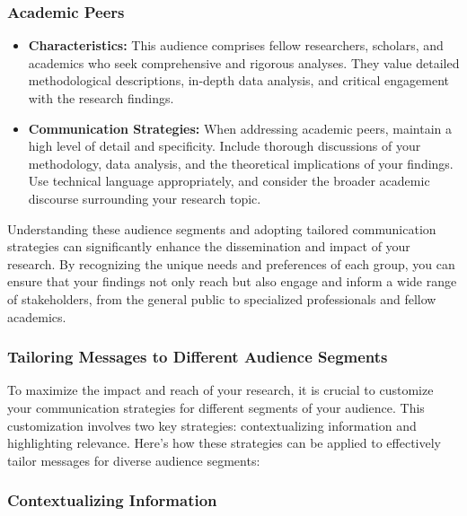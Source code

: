 \documentclass[
]{book}
\providecommand{\tightlist}{%
  \setlength{\itemsep}{0pt}\setlength{\parskip}{0pt}}
\begin{document}
\hypertarget{academic-peers}{%
\subsubsection{Academic Peers}\label{academic-peers}}

\begin{itemize}
\tightlist
\item
  \textbf{Characteristics:} This audience comprises fellow researchers, scholars, and academics who seek comprehensive and rigorous analyses. They value detailed methodological descriptions, in-depth data analysis, and critical engagement with the research findings.
\item
  \textbf{Communication Strategies:} When addressing academic peers, maintain a high level of detail and specificity. Include thorough discussions of your methodology, data analysis, and the theoretical implications of your findings. Use technical language appropriately, and consider the broader academic discourse surrounding your research topic.
\end{itemize}

Understanding these audience segments and adopting tailored communication strategies can significantly enhance the dissemination and impact of your research. By recognizing the unique needs and preferences of each group, you can ensure that your findings not only reach but also engage and inform a wide range of stakeholders, from the general public to specialized professionals and fellow academics.

\hypertarget{tailoring-messages-to-different-audience-segments}{%
\subsubsection*{Tailoring Messages to Different Audience Segments}\label{tailoring-messages-to-different-audience-segments}}

To maximize the impact and reach of your research, it is crucial to customize your communication strategies for different segments of your audience. This customization involves two key strategies: contextualizing information and highlighting relevance. Here's how these strategies can be applied to effectively tailor messages for diverse audience segments:

\hypertarget{contextualizing-information}{%
\subsubsection{Contextualizing Information}\label{contextualizing-information}}
\end{document}
